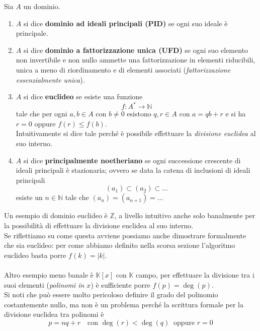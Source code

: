 \begin{definizione}
	Sia $A$ un dominio.
	\begin{enumerate}
		\item $A$ si dice \textbf{dominio ad ideali principali (PID)} se ogni suo ideale è principale.
		\item $A$ si dice \textbf{dominio a fattorizzazione unica (UFD)} se ogni suo elemento non invertibile e non nullo ammette una fattorizzazione in elementi riducibili, unica a meno di riordinamento e di elementi associati (\textit{fattorizzazione essenzialmente unica}).
		\item $A$ si dice \textbf{euclideo} se esiste una funzione 
		\begin{equation*}
		f: A^*\longrightarrow \mathbb{N}
		\end{equation*}
		tale che per ogni $a,b\in A$ con $b \neq 0$ esistono $q,r \in A$ con $a=qb+r$ e si ha $r=0$ oppure $f(r)\leq f(b)$. \\
		Intuitivamente si dice tale perché è possibile effettuare la \textit{divisione euclidea} al suo interno.
		\item $A$ si dice \textbf{principalmente noetheriano} se ogni successione crescente di ideali principali è stazionaria; ovvero se data la catena di inclusioni di ideali principali
		\begin{equation*}
		(a_1)\subset(a_2)\subset \dots
		\end{equation*}
		esiste un $n\in\mathbb{N}$ tale che $(a_n)=(a_{n+1})=\dots$
	\end{enumerate}
\end{definizione}
\begin{esempio}
	Un esempio di dominio euclideo è $\mathbb{Z}$, a livello intuitivo anche solo banalmente per la possibilità di effettuare la divisione euclidea al suo interno. \\ Se riflettiamo su come questa avviene possiamo anche dimostrare formalmente che sia euclideo: per come abbiamo definito nella scorsa sezione l'algoritmo euclideo basta porre $f(k)=|k|$. \\ \\ Altro esempio meno banale è $\mathbb{K}[x]$ con $\mathbb{K}$ campo, per effettuare la divisione tra i suoi elementi (\textit{polinomi in $x$}) è sufficiente porre $f(p)=\deg(p)$. \\ Si noti che può essere molto pericoloso definire il grado del polinomio costantemente nullo, ma non è un problema perché la scrittura formale per la divisione euclidea tra polinomi è 
	\begin{equation*}
	p=nq+r \ \ \ \text{ con } \deg(r)<\deg(q) \ \text{ oppure } r=0
	\end{equation*}
\end{esempio}

